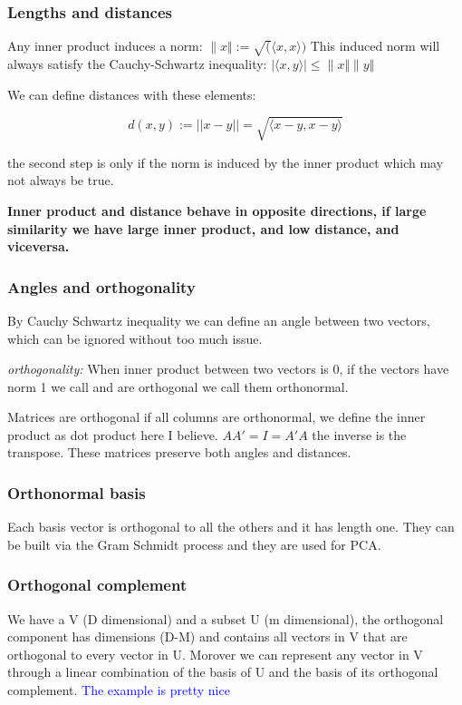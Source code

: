 \documentclass{article}
\newcommand{\tblue}[1]{\textcolor{blue}{#1}}
\begin{document}
\subsubsection{Lengths and distances}
Any inner product induces a norm: $\| x \Vert := \sqrt( \langle x,x \rangle )$
This induced norm will always satisfy the Cauchy-Schwartz inequality: $| \langle x,y \rangle  |
\leq \| x \Vert \| y \Vert 
$

We can define distances with these elements:

$$d(x,y) := || x- y || = \sqrt{\langle x-y, x-y \rangle} $$

the second step is only if the norm is induced by the inner product which may not always be true.

\textbf{Inner product and distance behave in opposite directions, if large similarity we have large inner product, and low distance, and viceversa.}




\subsubsection{Angles and orthogonality}
By Cauchy Schwartz inequality we can define an angle between two vectors, which can be ignored without too much issue.

\textit{orthogonality:} When inner product between two vectors is 0, if the vectors have norm 1 we call and are orthogonal 
we call them orthonormal.

Matrices are orthogonal if all columns are orthonormal, we define the inner product as dot product here I believe.
$A A' = I = A' A$ the inverse is the transpose. These matrices preserve both angles and distances.

\subsubsection{Orthonormal basis}
Each basis vector is orthogonal to all the others and it has length one.
They can be built via the Gram Schmidt process and they are used for PCA.



\subsubsection{Orthogonal complement}
We have a V (D dimensional) and a subset U (m dimensional), the orthogonal component has dimensions (D-M)
and contains all vectors in V that are orthogonal to every vector in U. 
Morover we can represent any vector in V through a linear combination of the basis of U and the basis of its orthogonal complement.
\tblue{The example is pretty nice}
\end{document}
